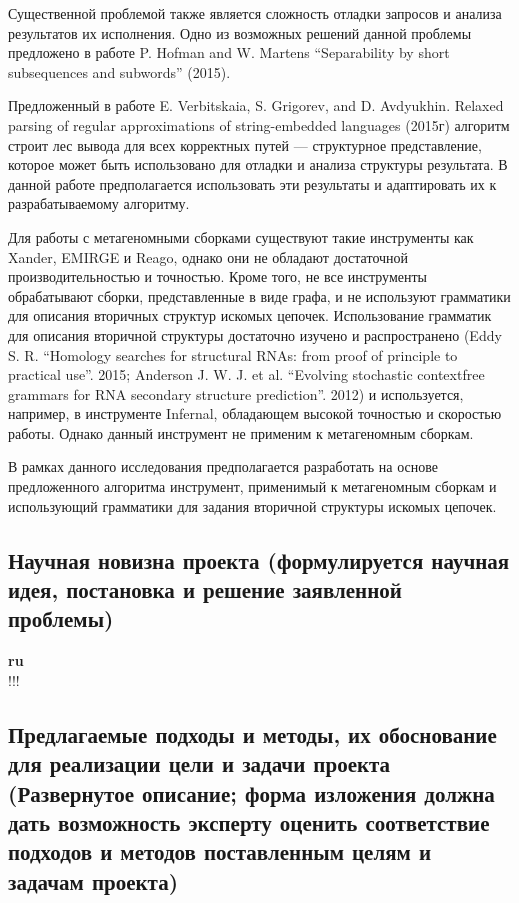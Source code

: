 \documentclass[12pt]{article}  %
\theoremstyle{remark}
\begin{document}
Существенной проблемой также является сложность отладки запросов и анализа результатов их исполнения. Одно из возможных решений данной проблемы предложено в работе P. Hofman and W. Martens “Separability by short subsequences and subwords” (2015).

Предложенный в работе E. Verbitskaia, S. Grigorev, and D. Avdyukhin. Relaxed parsing of regular approximations of string-embedded languages (2015г) алгоритм строит лес вывода для всех корректных путей — структурное представление, которое может быть использовано для отладки и анализа структуры результата. В данной работе предполагается использовать эти результаты и адаптировать их к разрабатываемому алгоритму.

Для работы с метагеномными сборками существуют такие инструменты как Xander, EMIRGE и Reago, однако они не обладают достаточной производительностью и точностью. Кроме того, не все инструменты обрабатывают сборки, представленные в виде графа, и не используют грамматики для описания вторичных структур искомых цепочек. Использование грамматик для описания вторичной структуры достаточно изучено и распространено (Eddy S. R. “Homology searches for structural RNAs: from proof of principle to practical use”. 2015; Anderson J. W. J. et al. “Evolving stochastic contextfree grammars for RNA secondary structure prediction”. 2012) и используется, например, в инструменте Infernal, обладающем высокой точностью и скоростью работы. Однако данный инструмент не применим к метагеномным сборкам.

В рамках данного исследования предполагается разработать на основе предложенного алгоритма инструмент, применимый к метагеномным сборкам и использующий грамматики для задания вторичной структуры искомых цепочек.


\subsection{Научная новизна проекта (формулируется научная идея, постановка и решение заявленной проблемы)}

\textbf{ru}\\
!!!


\subsection{Предлагаемые подходы и методы, их обоснование для реализации цели и задачи проекта (Развернутое описание; форма изложения должна дать возможность эксперту оценить соответствие подходов и методов поставленным целям и задачам проекта)}
\end{document}

